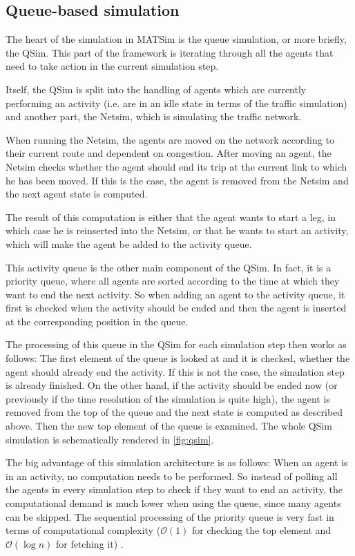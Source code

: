 \subsection{Queue-based simulation}

The heart of the simulation in MATSim is the queue simulation, or more briefly,
the QSim. This part of the framework is iterating through all the agents that need
to take action in the current simulation step.

Itself, the QSim is split into the handling of agents which are currently performing
an activity (i.e. are in an idle state in terms of the traffic simulation) and another
part, the Netsim, which is simulating the traffic network.

When running the Netsim, the agents are moved on the network according to their
current route and dependent on congestion. After moving an agent, the Netsim checks
whether the agent should end its trip at the current link to which he has been moved. If
this is the case, the agent is removed from the Netsim and the next agent state is computed.

The result of this computation is either that the agent wants to start a leg, in
which case he is reinserted into the Netsim, or that he wants to start an activity,
which will make the agent be added to the activity queue.

This activity queue is the other main component of the QSim. In fact, it is a
priority queue, where all agents are sorted according to the time at which they
want to end the next activity. So when adding an agent to the activity queue, it first
is checked when the activity should be ended and then the agent is inserted at the
corresponding position in the queue.

The processing of this queue in the QSim for each simulation step then works as
follows: The first element of the queue is looked at and it is checked, whether the
agent should already end the activity. If this is not the case, the simulation step
is already finished. On the other hand, if the activity should be ended now (or
previously if the time resolution of the simulation is quite high), the agent is
removed from the top of the queue and the next state is computed as described above.
Then the new top element of the queue is examined.
The whole QSim simulation is schematically rendered in \cref{fig:qsim}.

The big advantage of this simulation architecture is as follows: When an agent is
in an activity, no computation needs to be performed. So instead of polling all
the agents in every simulation step to check if they want to end an activity, the
computational demand is much lower when using the queue, since many agents can
be skipped. The sequential processing of the priority queue is very fast in terms
of computational complexity ($\mathcal{O}(1)$ for checking the top element
and $\mathcal{O}(\log n)$ for fetching it) \citep{JavaPQ}.

